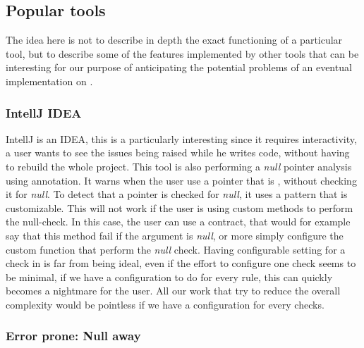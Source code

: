 \subsection{Popular tools}
\label{subsec:other_tools_features}

The idea here is not to describe in depth the exact functioning of a particular tool, but to describe some of the features implemented by other tools that can be interesting for our purpose of anticipating the potential problems of an eventual implementation on \slang{}.

\subsubsection{IntellJ IDEA}
\label{subsubsec:intellj_idea}

IntellJ is an IDEA, this is a particularly interesting since it requires interactivity, a user wants to see the issues being raised while he writes code, without having to rebuild the whole project. 
This tool is also performing a \emph{null} pointer analysis using annotation. 
It warns when the user use a pointer that is \nullable{}, without checking it for \emph{null}. 
To detect that a pointer is checked for \emph{null}, it uses a pattern that is customizable. 
This will not work if the user is using custom methods to perform the null-check. 
In this case, the user can use a contract, that would for example say that this method fail if the argument is \emph{null}, or more simply configure the custom function that perform the \emph{null} check.\newline
Having configurable setting for a check in \slang{} is far from being ideal, even if the effort to configure one check seems to be minimal, if we have a configuration to do for every rule, this can quickly becomes a nightmare for the user. 
All our work that try to reduce the overall complexity would be pointless if we have a configuration for every checks.


\subsubsection{Error prone: Null away}
\label{subsubsec:error_prone}

